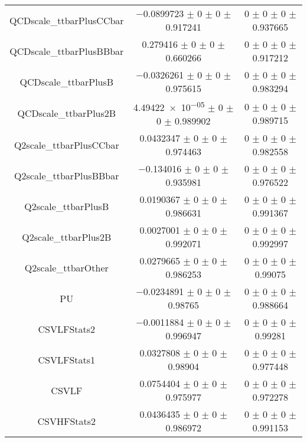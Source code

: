 \begin{table}
\begin{tabular}{ccc}
QCDscale\_ttbarPlusCCbar 	& \num{-0.0899723} $\pm$ \num{0} $\pm$ \num{0} $\pm$ \num{0.917241} 	& \num{0} $\pm$ \num{0} $\pm$ \num{0} $\pm$ \num{0.937665}\\
QCDscale\_ttbarPlusBBbar 	& \num{0.279416} $\pm$ \num{0} $\pm$ \num{0} $\pm$ \num{0.660266} 	& \num{0} $\pm$ \num{0} $\pm$ \num{0} $\pm$ \num{0.917212}\\
QCDscale\_ttbarPlusB 	& \num{-0.0326261} $\pm$ \num{0} $\pm$ \num{0} $\pm$ \num{0.975615} 	& \num{0} $\pm$ \num{0} $\pm$ \num{0} $\pm$ \num{0.983294}\\
QCDscale\_ttbarPlus2B 	& \num{4.49422e-05} $\pm$ \num{0} $\pm$ \num{0} $\pm$ \num{0.989902} 	& \num{0} $\pm$ \num{0} $\pm$ \num{0} $\pm$ \num{0.989715}\\
Q2scale\_ttbarPlusCCbar 	& \num{0.0432347} $\pm$ \num{0} $\pm$ \num{0} $\pm$ \num{0.974463} 	& \num{0} $\pm$ \num{0} $\pm$ \num{0} $\pm$ \num{0.982558}\\
Q2scale\_ttbarPlusBBbar 	& \num{-0.134016} $\pm$ \num{0} $\pm$ \num{0} $\pm$ \num{0.935981} 	& \num{0} $\pm$ \num{0} $\pm$ \num{0} $\pm$ \num{0.976522}\\
Q2scale\_ttbarPlusB 	& \num{0.0190367} $\pm$ \num{0} $\pm$ \num{0} $\pm$ \num{0.986631} 	& \num{0} $\pm$ \num{0} $\pm$ \num{0} $\pm$ \num{0.991367}\\
Q2scale\_ttbarPlus2B 	& \num{0.0027001} $\pm$ \num{0} $\pm$ \num{0} $\pm$ \num{0.992071} 	& \num{0} $\pm$ \num{0} $\pm$ \num{0} $\pm$ \num{0.992997}\\
Q2scale\_ttbarOther 	& \num{0.0279665} $\pm$ \num{0} $\pm$ \num{0} $\pm$ \num{0.986253} 	& \num{0} $\pm$ \num{0} $\pm$ \num{0} $\pm$ \num{0.99075}\\
PU 	& \num{-0.0234891} $\pm$ \num{0} $\pm$ \num{0} $\pm$ \num{0.98765} 	& \num{0} $\pm$ \num{0} $\pm$ \num{0} $\pm$ \num{0.988664}\\
CSVLFStats2 	& \num{-0.0011884} $\pm$ \num{0} $\pm$ \num{0} $\pm$ \num{0.996947} 	& \num{0} $\pm$ \num{0} $\pm$ \num{0} $\pm$ \num{0.99281}\\
CSVLFStats1 	& \num{0.0327808} $\pm$ \num{0} $\pm$ \num{0} $\pm$ \num{0.98904} 	& \num{0} $\pm$ \num{0} $\pm$ \num{0} $\pm$ \num{0.977448}\\
CSVLF 	& \num{0.0754404} $\pm$ \num{0} $\pm$ \num{0} $\pm$ \num{0.975977} 	& \num{0} $\pm$ \num{0} $\pm$ \num{0} $\pm$ \num{0.972278}\\
CSVHFStats2 	& \num{0.0436435} $\pm$ \num{0} $\pm$ \num{0} $\pm$ \num{0.986972} 	& \num{0} $\pm$ \num{0} $\pm$ \num{0} $\pm$ \num{0.991153}\\

\end{tabular}
\end{table}
